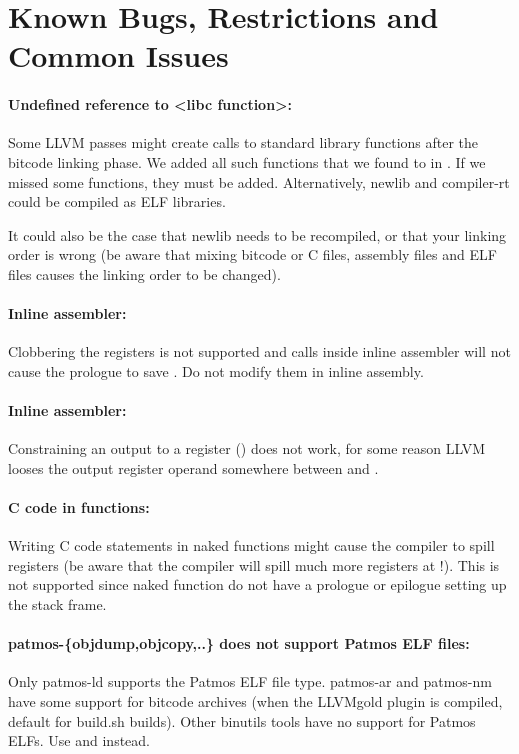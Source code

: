 \section{Known Bugs, Restrictions and Common Issues}
\label{sec:toolchain:knownbugs}


\paragraph{Undefined reference to <libc function>:} Some LLVM passes might create calls to standard library functions
after the bitcode linking phase. We added all such functions that we found to  in .
If we missed some functions, they must be added. Alternatively, newlib and compiler-rt could be compiled as ELF libraries.

It could also be the case that newlib needs to be recompiled, or that your linking order is wrong (be aware
that mixing bitcode or C files, assembly files and ELF files causes the linking order to be changed).


\paragraph{Inline assembler:} Clobbering the registers  is not supported and calls inside
inline assembler will not cause the prologue to save . Do not modify them in inline assembly.


\paragraph{Inline assembler:} Constraining an output to a register () does not work, for some reason
LLVM looses the output register operand somewhere between  and
.


\paragraph{C code in  functions:} Writing C code statements in naked functions might cause
the compiler to spill registers (be aware that the compiler will spill much more registers at !). 
This is not supported since naked function do not have a prologue or epilogue setting up the stack frame.


\paragraph{patmos-\{objdump,objcopy,..\} does not support Patmos ELF files:} Only patmos-ld supports the Patmos
ELF file type. patmos-ar and patmos-nm have some support for bitcode archives (when the LLVMgold plugin is
compiled, default for build.sh builds). Other binutils tools have no support for Patmos ELFs.
Use  and  instead.


